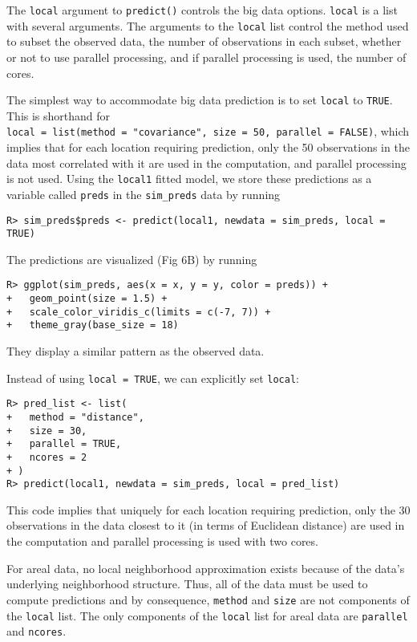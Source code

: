 \documentclass[10pt,letterpaper]{article}
\begin{document}
The \texttt{local} argument to \texttt{predict()} controls the big data
options. \texttt{local} is a list with several arguments. The arguments
to the \texttt{local} list control the method used to subset the
observed data, the number of observations in each subset, whether or not
to use parallel processing, and if parallel processing is used, the
number of cores.

The simplest way to accommodate big data prediction is to set
\texttt{local} to \texttt{TRUE}. This is shorthand for
\texttt{local\ =\ list(method\ =\ "covariance",\ size\ =\ 50,\ parallel\ =\ FALSE)},
which implies that for each location requiring prediction, only the 50
observations in the data most correlated with it are used in the
computation, and parallel processing is not used. Using the
\texttt{local1} fitted model, we store these predictions as a variable
called \texttt{preds} in the \texttt{sim\_preds} data by running

\begin{verbatim}
R> sim_preds$preds <- predict(local1, newdata = sim_preds, local = TRUE)
\end{verbatim}

\noindent The predictions are visualized (Fig 6B) by running

\begin{verbatim}
R> ggplot(sim_preds, aes(x = x, y = y, color = preds)) +
+   geom_point(size = 1.5) +
+   scale_color_viridis_c(limits = c(-7, 7)) + 
+   theme_gray(base_size = 18)
\end{verbatim}

\noindent They display a similar pattern as the observed data.

Instead of using \texttt{local\ =\ TRUE}, we can explicitly set
\texttt{local}:

\begin{verbatim}
R> pred_list <- list(
+   method = "distance",
+   size = 30,
+   parallel = TRUE,
+   ncores = 2
+ )
R> predict(local1, newdata = sim_preds, local = pred_list)
\end{verbatim}

\noindent This code implies that uniquely for each location requiring
prediction, only the 30 observations in the data closest to it (in terms
of Euclidean distance) are used in the computation and parallel
processing is used with two cores.

For areal data, no local neighborhood approximation exists because of
the data's underlying neighborhood structure. Thus, all of the data must
be used to compute predictions and by consequence, \texttt{method} and
\texttt{size} are not components of the \texttt{local} list. The only
components of the \texttt{local} list for areal data are
\texttt{parallel} and \texttt{ncores}.
\end{document}
